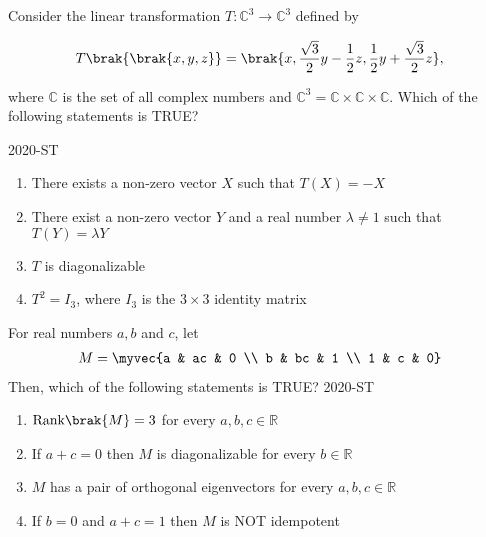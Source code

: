 \iffalse
\chapter{2020}
\author{ee24btech11056}
\section{st}
\fi
\item Consider the linear transformation  $T : \mathbb{C}^3 \rightarrow \mathbb{C}^3$  defined by

\begin{align*}
T\brak{\brak{x, y, z}} = \brak{ x, \frac{\sqrt{3}}{2} y - \frac{1}{2} z, \frac{1}{2} y + \frac{\sqrt{3}}{2} z },
\end{align*}

where  $\mathbb{C}$ is the set of all complex numbers and  $\mathbb{C}^3 = \mathbb{C} \times \mathbb{C} \times \mathbb{C} $. Which of the following statements is TRUE?

\hfill{2020-ST}

\begin{enumerate}
    \item There exists a non-zero vector  $X$ such that  $T(X) = -X$
    \item There exist a non-zero vector $Y $ and a real number  $\lambda \neq 1$ such that  $T(Y) = \lambda Y$
    \item  $T$ is diagonalizable
    \item  $T^2 = I_3$, where $I_3$ is the  $3 \times 3$ identity matrix
\end{enumerate}

\item For real numbers  $a, b$ and  $c$, let
\begin{align*}
M = \myvec{a & ac & 0 \\ b & bc & 1 \\ 1 & c & 0}
\end{align*}
Then, which of the following statements is TRUE?
\hfill{2020-ST}
\begin{enumerate}
    \item  $\text{Rank}\brak{M} = 3 $ for every  $a, b, c \in \mathbb{R}$
    \item If  $a + c = 0$ then  $M$ is diagonalizable for every  $b \in \mathbb{R}$
    \item  $M$ has a pair of orthogonal eigenvectors for every  $a, b, c \in \mathbb{R}$
    \item If  $b = 0$ and  $a + c = 1$ then  $M$ is NOT idempotent
\end{enumerate}

